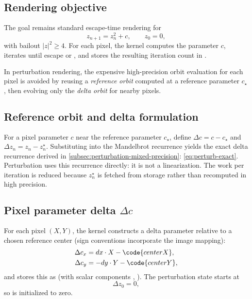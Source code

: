 \subsection{Rendering objective}
\label{sec:perturb-only-goal}

The goal remains standard escape-time rendering for
\[
z_{n+1} = z_n^2 + c,\qquad z_0=0,
\]
with bailout \(|z|^2 \ge 4\). For each pixel, the kernel computes the parameter
\(c\), iterates until escape or , and stores the resulting
iteration count in .

In perturbation rendering, the expensive high-precision orbit evaluation for
each pixel is avoided by reusing a \emph{reference orbit} computed at a
reference parameter \(c_\star\), then evolving only the \emph{delta orbit} for
nearby pixels.

\subsection{Reference orbit and delta formulation}
\label{sec:perturb-only-deltas}

For a pixel parameter \(c\) near the reference parameter \(c_\star\), define
\(\Delta c = c - c_\star\) and \(\Delta z_n = z_n - z_n^\star\).
Substituting into the Mandelbrot recurrence yields the exact delta recurrence
derived in \cref{subsec:perturbation-mixed-precision}:
\cref{eq:perturb-exact}.
Perturbation uses this recurrence directly: it is not a linearization. The work
per iteration is reduced because \(z_n^\star\) is fetched from storage rather
than recomputed in high precision.

\subsection{Pixel parameter delta \texorpdfstring{$\Delta c$}{Delta c}}
\label{sec:perturb-only-deltac}

For each pixel \((X,Y)\), the kernel constructs a delta parameter relative to a
chosen reference center (sign conventions incorporate the image mapping):
\begin{align}
\Delta c_x &= dx \cdot X - \code{centerX}, \\
\Delta c_y &= -dy \cdot Y - \code{centerY},
\end{align}
and stores this as  (with scalar components ,
). The perturbation state starts at
\[
\Delta z_0 = 0,
\]
so  is initialized to zero.

